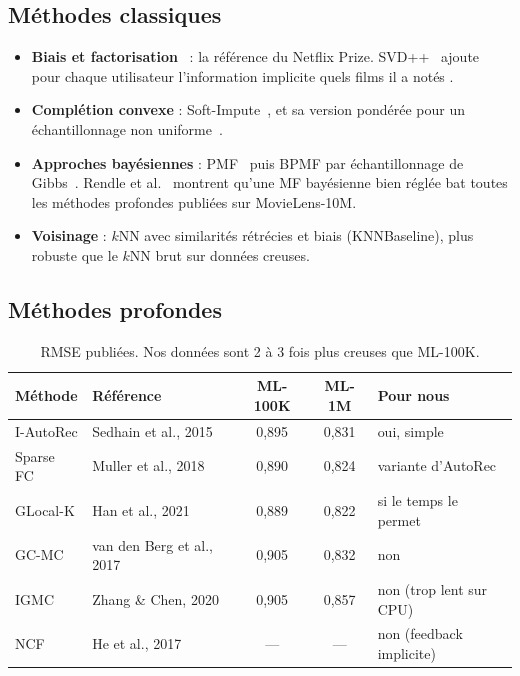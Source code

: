\documentclass[11pt,a4paper]{article}
\begin{document}
\subsection{Méthodes classiques}

\begin{itemize}
  \item \textbf{Biais et factorisation}~\cite{koren2009} : la référence du
        Netflix Prize. SVD++~\cite{koren2008} ajoute pour chaque utilisateur
        l'information implicite \og quels films il a notés \fg{}.
  \item \textbf{Complétion convexe} : Soft-Impute~\cite{softimpute}, et sa
        version pondérée pour un échantillonnage non uniforme~\cite{srebro2010}.
  \item \textbf{Approches bayésiennes} : PMF~\cite{pmf} puis BPMF par
        échantillonnage de Gibbs~\cite{bpmf}. Rendle et al.~\cite{rendle2019}
        montrent qu'une MF bayésienne bien réglée bat toutes les méthodes
        profondes publiées sur MovieLens-10M.
  \item \textbf{Voisinage} : $k$NN avec similarités rétrécies et biais
        (KNNBaseline), plus robuste que le $k$NN brut sur données creuses.
\end{itemize}

\subsection{Méthodes profondes}

\begin{table}[H]
\centering
\begin{tabular}{@{}llccl@{}}
\toprule
\textbf{Méthode} & \textbf{Référence} & \textbf{ML-100K} & \textbf{ML-1M} & \textbf{Pour nous} \\
\midrule
I-AutoRec   & Sedhain et al., 2015~\cite{autorec}   & 0,895 & 0,831 & oui, simple \\
Sparse FC   & Muller et al., 2018~\cite{sparsefc}   & 0,890 & 0,824 & variante d'AutoRec \\
GLocal-K    & Han et al., 2021~\cite{glocalk}       & 0,889 & 0,822 & si le temps le permet \\
GC-MC       & van den Berg et al., 2017~\cite{gcmc} & 0,905 & 0,832 & non \\
IGMC        & Zhang \& Chen, 2020~\cite{igmc}       & 0,905 & 0,857 & non (trop lent sur CPU) \\
NCF         & He et al., 2017~\cite{ncf}            & ---   & ---   & non (feedback implicite) \\
\bottomrule
\end{tabular}
\caption{RMSE publiées. Nos données sont 2 à 3 fois plus creuses que ML-100K.}
\end{table}
\end{document}
